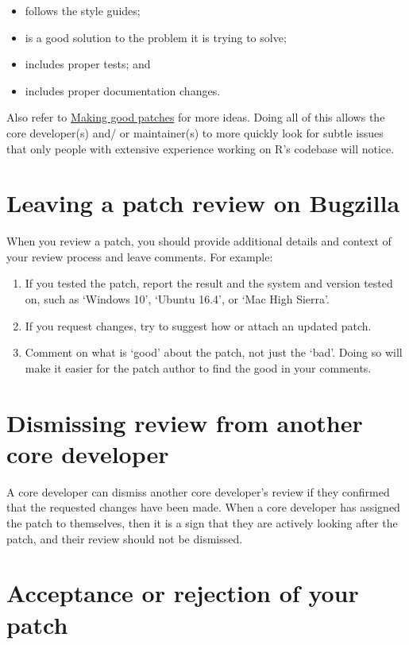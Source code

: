 \documentclass[
  letterpaper,
  DIV=11,
  numbers=noendperiod]{scrreprt}
\begin{document}
\begin{itemize}
\item
  follows the style guides;
\item
  is a good solution to the problem it is trying to solve;
\item
  includes proper tests; and
\item
  includes proper documentation changes.
\end{itemize}

Also refer to \hyperref[GoodPatches]{Making good patches} for more
ideas. Doing all of this allows the core developer(s) and/ or
maintainer(s) to more quickly look for subtle issues that only people
with extensive experience working on R's codebase will notice.

\section{Leaving a patch review on
Bugzilla}\label{leaving-a-patch-review-on-bugzilla}

When you review a patch, you should provide additional details and
context of your review process and leave comments. For example:

\begin{enumerate}
\def\labelenumi{\arabic{enumi}.}
\item
  If you tested the patch, report the result and the system and version
  tested on, such as `Windows 10', `Ubuntu 16.4', or `Mac High Sierra'.
\item
  If you request changes, try to suggest how or attach an updated patch.
\item
  Comment on what is `good' about the patch, not just the `bad'. Doing
  so will make it easier for the patch author to find the good in your
  comments.
\end{enumerate}

\section{Dismissing review from another core
developer}\label{dismissing-review-from-another-core-developer}

A core developer can dismiss another core developer's review if they
confirmed that the requested changes have been made. When a core
developer has assigned the patch to themselves, then it is a sign that
they are actively looking after the patch, and their review should not
be dismissed.

\section{Acceptance or rejection of your
patch}\label{acceptance-or-rejection-of-your-patch}
\end{document}
